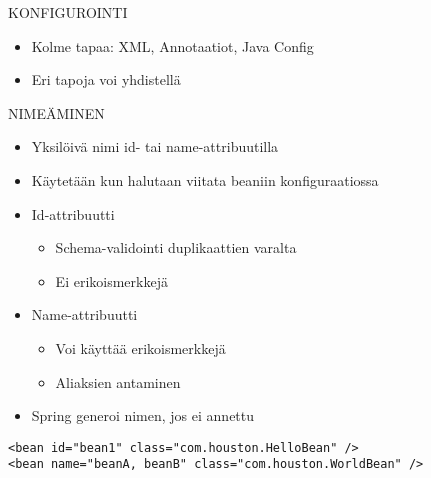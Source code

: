 \documentclass[hyperref={pdfauthor=\AUTHOR},14pt]{beamer}
\author{\AUTHOR}
\title[\TITLE]{\TITLE}
\date{\DATE}
\begin{document}
\begin{frame}[plain]
\titlepage
\end{frame}

\begin{frame}[t, fragile]{KONFIGUROINTI}
\begin{itemize}
\item Kolme tapaa: XML, Annotaatiot, Java Config
\item Eri tapoja voi yhdistellä
\end{itemize}
\end{frame}

\begin{frame}[t, fragile]{ NIMEÄMINEN}
\begin{itemize}
\item Yksilöivä nimi id- tai name-attribuutilla
\item Käytetään kun halutaan viitata beaniin konfiguraatiossa
\item Id-attribuutti
\begin{itemize}
\item Schema-validointi duplikaattien varalta
\item Ei erikoismerkkejä
\end{itemize}
\item Name-attribuutti
\begin{itemize}
\item Voi käyttää erikoismerkkejä
\item Aliaksien antaminen 
\end{itemize}
\item Spring generoi nimen, jos ei annettu
\end{itemize}
\begin{lstlisting}
<bean id="bean1" class="com.houston.HelloBean" />
<bean name="beanA, beanB" class="com.houston.WorldBean" />
\end{lstlisting}
\end{frame}
\end{document}
